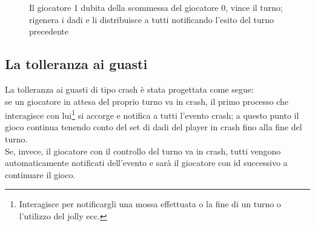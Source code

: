 \documentclass{llncs}
\begin{document}
		\begin{figure}[H]
			
			\centering
			\caption{\small{Il giocatore 1 dubita della scommessa del giocatore 0, vince il turno; rigenera i dadi e li distribuisce a tutti notificando l'esito del turno precedente}}
		\end{figure}

\subsection{La tolleranza ai guasti}

La tolleranza ai guasti di tipo crash è stata progettata come segue:\\
se un giocatore in attesa del proprio turno va in crash, il primo processo che interagisce con lui\footnote{Interagisce per notificargli una mossa effettuata o la fine di un turno o l'utilizzo del jolly ecc.} si accorge e notifica a tutti l'evento crash; a questo punto il gioco continua tenendo conto del set di dadi del player in crash fino alla fine del turno.\\
Se, invece, il giocatore con il controllo del turno va in crash, tutti vengono automaticamente notificati dell'evento e sarà il giocatore con id successivo a continuare il gioco.
\end{document}
